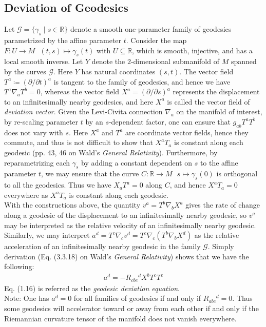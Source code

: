 \documentclass[11pt, onesided]{book}
\theoremstyle{break}
\theoremstyle{break}
\newcommand{\R}{\mathbb{R}}
\newcommand{\pd}{\partial}
\newcommand{\txt}{Wald's \textit{General Relativity}}
\newcommand{\note}{\color{red}Note: \color{black}}
\begin{document}
\subsection{Deviation of Geodesics}
Let $\mathcal{G} = \{\gamma_s\mid s \in \R\}$ denote a smooth one-parameter family of geodesics parametrized by the affine parameter $t$. Consider the map $F:U \to M \ \ \  (t,s) \mapsto \gamma_s(t)$ with $U \subseteq \R$, which is smooth, injective, and has a local smooth inverse. Let $Y$ denote the $2$-dimensional submanifold of $M$ spanned by the curves $\mathcal{G}$. Here $Y$ has natural coordinates $(s,t)$. The vector field $T^a\coloneqq (\pd /\pd t)^a$ is tangent to the family of geodesics, and hence we have $T^a \nabla_a T^b = 0$, whereas the vector field $X^a=(\pd /\pd s)^a$ represents the displacement to an infinitesimally nearby geodesics, and here $X^a$ is called the vector field of \textit{deviation vector}. Given the Levi-Civita connection $\nabla_a$ on the manifold of interest, by re-scaling parameter $t$ by an $s$-dependent factor, one can ensure that $g_{ab} T^a T^b$ does not vary with $s$. Here $X^a$ and $T^a$ are coordinate vector fields, hence they commute, and thus is not difficult to show that $X^aT_a$ is constant along each geodesic (pp. 43, 46 on \txt). Furthermore, by reparametrizing each $\gamma_s$ by adding a constant dependent on $s$ to the affine parameter $t$, we may ensure that the curve $C:\R \to M \ \ \ s\mapsto\gamma_s(0)$ is orthogonal to all the geodesics. Thus we have $X_aT^a = 0$ along $C$, and hence $X^aT_a = 0$ everywhere as $X^aT_a$ is constant along each geodesic. \\

With the constructions above, the quantity $v^a = T^b\nabla_b X^a$ gives the rate of change along a geodesic of the displacement to an infinitesimally nearby geodesic, so $v^a$ may be interpreted as the relative velocity of an infinitesimally nearby geodesic. Similarly, we may interpret $a^d = T^c \nabla_c v^d = T^c \nabla_c(T^b \nabla_b X^d)$ as the relative acceleration of an infinitesimally nearby geodesic in the family $\mathcal{G}$. Simply derivation (Eq. (3.3.18) on \txt) shows that we have the following:
\begin{align}
a^d = -R_{cbe}{}^dX^bT^cT^e
\end{align}
Eq. (1.16) is referred as the \textit{geodesic deviation equation}.\\

\note One has $a^d =0$ for all families of geodesics if and only if $R_{abc}{}^d = 0$. Thus some geodesics will accelerator toward or away from each other if and only if the Riemannian curvature tensor of the manifold does not vanish everywhere. 
\end{document}
